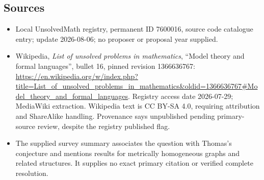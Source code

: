 \documentclass[11pt]{article}
\begin{document}
\subsection{Sources}
\begin{itemize}
\item Local UnsolvedMath registry, permanent ID 7600016, source code catalogue entry; update 2026-08-06; no proposer or proposal year supplied.
\item Wikipedia, \emph{List of unsolved problems in mathematics}, ``Model theory and formal languages'', bullet 16, pinned revision 1366636767: \url{https://en.wikipedia.org/w/index.php?title=List_of_unsolved_problems_in_mathematics&oldid=1366636767#Model_theory_and_formal_languages}. Registry access date 2026-07-29; MediaWiki extraction. Wikipedia text is CC BY-SA 4.0, requiring attribution and ShareAlike handling. Provenance says unpublished pending primary-source review, despite the registry published flag.
\item The supplied survey summary associates the question with Thomas's conjecture and mentions results for metrically homogeneous graphs and related structures. It supplies no exact primary citation or verified complete resolution.
\end{itemize}
\end{document}
